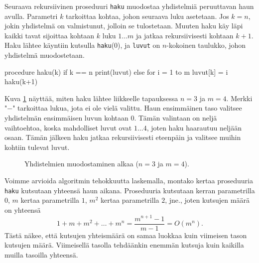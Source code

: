 Seuraava rekursiivinen proseduuri \texttt{haku} muodostaa
yhdistelmiä peruuttavan haun avulla.
Parametri $k$ tarkoittaa kohtaa, johon seuraava luku asetetaan.
Jos $k=n$, jokin yhdistelmä on valmistunut, jolloin se tulostetaan.
Muuten haku käy läpi kaikki tavat sijoittaa kohtaan $k$ luku $1 \dots m$
ja jatkaa rekursiivisesti kohtaan $k+1$.
Haku lähtee käyntiin kutsulla \texttt{haku}(0),
ja \texttt{luvut} on $n$-kokoinen taulukko, johon yhdistelmä muodostetaan.

\begin{code}
procedure haku(k)
    if k == n
        print(luvut)
    else
        for i = 1 to m
            luvut[k] = i
            haku(k+1)
\end{code}

Kuva \ref{fig:perhak} näyttää, miten haku lähtee liikkeelle
tapauksessa $n=3$ ja $m=4$.
Merkki "$-$" tarkoittaa lukua, jota ei ole vielä valittu.
Haun ensimmäinen taso valitsee yhdistelmän
ensimmäisen luvun kohtaan $0$.
Tämän valintaan on neljä vaihtoehtoa,
koska mahdolliset luvut ovat $1 \dots 4$,
joten haku haarautuu neljään osaan.
Tämän jälkeen haku jatkaa rekursiivisesti eteenpäin
ja valitsee muihin kohtiin tulevat luvut.

\begin{figure}
\center
{}
\caption{Yhdistelmien muodostaminen alkaa ($n=3$ ja $m=4$).}
\label{fig:perhak}
\end{figure}

Voimme arvioida algoritmin tehokkuutta laskemalla,
montako kertaa proseduuria \texttt{haku} kutsutaan yhteensä haun aikana.
Proseduuria kutsutaan kerran parametrilla $0$,
$m$ kertaa parametrilla $1$, $m^2$ kertaa parametrilla $2$, jne.,
joten kutsujen määrä on yhteensä
\[
1+m+m^2+\dots+m^n = \frac{m^{n+1}-1}{m-1} = O(m^n).
\]
Tästä näkee, että kutsujen yhteismäärä on samaa luokkaa kuin
viimeisen tason kutsujen määrä.
Viimeisellä tasolla tehdäänkin enemmän kutsuja kuin
kaikilla muilla tasoilla yhteensä.

